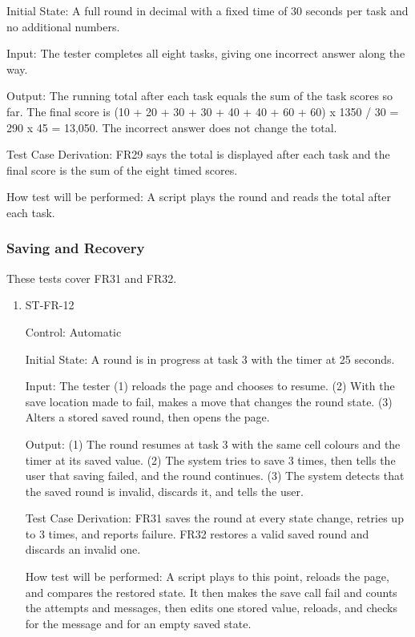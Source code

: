 \documentclass[12pt, titlepage]{article}
\begin{document}
\begin{enumerate}
Initial State: A full round in decimal with a fixed time of 30 seconds per task and no additional numbers.

Input: The tester completes all eight tasks, giving one incorrect answer along the way.

Output: The running total after each task equals the sum of the task scores so far. The final score is (10 + 20 + 30 + 30 + 40 + 40 + 60 + 60) x 1350 / 30 = 290 x 45 = 13,050. The incorrect answer does not change the total.

Test Case Derivation: FR29 says the total is displayed after each task and the final score is the sum of the eight timed scores.

How test will be performed: A script plays the round and reads the total after each task.

\end{enumerate}

\subsubsection{Saving and Recovery}

These tests cover FR31 and FR32.

\begin{enumerate}

\item{ST-FR-12\\}

Control: Automatic

Initial State: A round is in progress at task 3 with the timer at 25 seconds.

Input: The tester (1) reloads the page and chooses to resume. (2) With the save location made to fail, makes a move that changes the round state. (3) Alters a stored saved round, then opens the page.

Output: (1) The round resumes at task 3 with the same cell colours and the timer at its saved value. (2) The system tries to save 3 times, then tells the user that saving failed, and the round continues. (3) The system detects that the saved round is invalid, discards it, and tells the user.

Test Case Derivation: FR31 saves the round at every state change, retries up to 3 times, and reports failure. FR32 restores a valid saved round and discards an invalid one.

How test will be performed: A script plays to this point, reloads the page, and compares the restored state. It then makes the save call fail and counts the attempts and messages, then edits one stored value, reloads, and checks for the message and for an empty saved state.

\end{enumerate}
\end{document}
